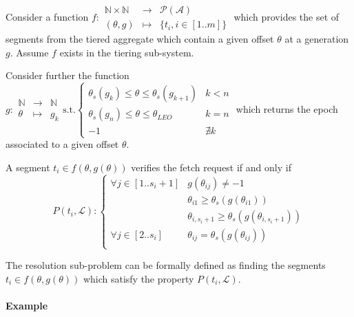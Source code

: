 \documentclass{article}
\begin{document}
Consider a function $f:\begin{array}{lll}
\mathbb{N}\times\mathbb{N} & \rightarrow & \mathcal{P(A)}\\
(\theta, g) & \mapsto & \{t_i, i \in [1..m]\}
\end{array}$ which provides the set of segments from the tiered aggregate which contain a given offset $\theta$ at a generation $g$. Assume $f$ exists in the tiering sub-system.

Consider further the function $g:\begin{array}{lll}
\mathbb{N} & \rightarrow & \mathbb{N} \\
\theta & \mapsto & g_k
\end{array} \textrm{s.t.} \begin{cases}
\theta_s(g_k) \leq \theta \leq \theta_s(g_{k+1}) & k < n\\
\theta_s(g_n) \leq \theta \leq \theta_{LEO}       & k = n\\
-1 & \nexists k
\end{cases}$ which returns the epoch associated to a given offset $\theta$.

A segment $t_i \in f(\theta, g(\theta))$ verifies the fetch request if and only if
\[P(t_i, \mathcal{L}):
\begin{cases}
\forall j \in [1..s_i + 1] & g(\theta_{ij}) \neq -1\\
& \theta_{i1} \geq \theta_s(g(\theta_{i1}))\\
& \theta_{i,s_i + 1} \geq \theta_s(g(\theta_{i,s_i + 1}))\\
\forall j \in [2..s_i] & \theta_{ij} = \theta_s(g(\theta_{ij}))\\
\end{cases}
\]

The resolution sub-problem can be formally defined as finding the segments $t_i \in f(\theta, g(\theta))$ which satisfy the property $P(t_i, \mathcal{L})$.

\paragraph{Example}


\newpage

{}
\end{document}
